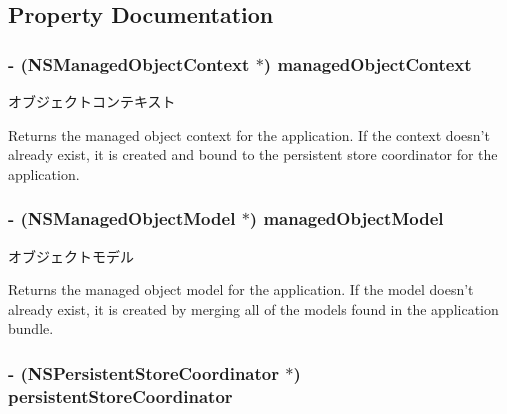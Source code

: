 \subsection{Property Documentation}
\hypertarget{interface_go_clinic_app_delegate_a56340d41d4eb164878497e7b9ee3fcf6}{
\subsubsection[{managedObjectContext}]{\setlength{\rightskip}{0pt plus 5cm}-\/ (NSManagedObjectContext $\ast$) managedObjectContext}}
\label{interface_go_clinic_app_delegate_a56340d41d4eb164878497e7b9ee3fcf6}


オブジェクトコンテキスト 

Returns the managed object context for the application. If the context doesn't already exist, it is created and bound to the persistent store coordinator for the application. \hypertarget{interface_go_clinic_app_delegate_a83de9dbffc02726a241ab93c8a130ccf}{
\subsubsection[{managedObjectModel}]{\setlength{\rightskip}{0pt plus 5cm}-\/ (NSManagedObjectModel $\ast$) managedObjectModel}}
\label{interface_go_clinic_app_delegate_a83de9dbffc02726a241ab93c8a130ccf}


オブジェクトモデル 

Returns the managed object model for the application. If the model doesn't already exist, it is created by merging all of the models found in the application bundle. \hypertarget{interface_go_clinic_app_delegate_acec743b348a53b0628186921e68af000}{
\subsubsection[{persistentStoreCoordinator}]{\setlength{\rightskip}{0pt plus 5cm}-\/ (NSPersistentStoreCoordinator $\ast$) persistentStoreCoordinator}}
\label{interface_go_clinic_app_delegate_acec743b348a53b0628186921e68af000}


